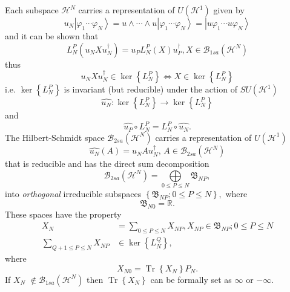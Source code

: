 \documentclass[aps,preprint]{revtex4}%
\begin{document}
Each subspace $\mathcal{H}^{N}$ carries a representation of $U\left(
\mathcal{H}^{1}\right)  $ given by
\begin{equation}
u_{N}\left\vert \varphi_{1}\cdots\varphi_{N}\right\rangle =u\wedge\cdots\wedge
u\left\vert \varphi_{1}\cdots\varphi_{N}\right\rangle =\left\vert u\varphi
_{1}\cdots u\varphi_{N}\right\rangle
\end{equation}
and it can be shown that
\begin{equation}
L_{N}^{P}\left(  u_{N}Xu_{N}^{\dagger}\right)  =u_{P}L_{N}^{P}\left(
X\right)  u_{P}^{\dagger},X\in\mathcal{B}_{1sa}\left(  \mathcal{H}^{N}\right)
\end{equation}
thus
\begin{equation}
u_{N}Xu_{N}^{\dagger}\in\ker\left\{  L_{N}^{P}\right\}  \Leftrightarrow
X\in\ker\left\{  L_{N}^{P}\right\}
\end{equation}
i.e. $\ker\left\{  L_{N}^{P}\right\}  $ is invariant (but reducible) under the
action of $SU\left(  \mathcal{H}^{1}\right)  $
\begin{equation}
\widehat{u_{N}}:\ker\left\{  L_{N}^{P}\right\}  \rightarrow\ker\left\{
L_{N}^{P}\right\}
\end{equation}
and
\begin{equation}
\widehat{u_{P}}\circ L_{N}^{P}=L_{N}^{P}\circ\widehat{u_{N}}.
\end{equation}
The Hilbert-Schmidt space $\mathcal{B}_{2sa}\left(  \mathcal{H}^{N}\right)  $
carries a representation of $U\left(  \mathcal{H}^{1}\right)  $
\begin{equation}
\widehat{u_{N}}\left(  A\right)  =u_{N}Au_{N}^{\dagger},\,A\in\mathcal{B}%
_{2sa}\left(  \mathcal{H}^{N}\right)
\end{equation}
that is reducible and has the direct sum decomposition
\begin{equation}
\mathcal{B}_{2sa}\left(  \mathcal{H}^{N}\right)  =%
{\displaystyle\bigoplus\limits_{0\leq P\leq N}}
\mathfrak{B}_{NP},
\end{equation}
into \emph{orthogonal }irreducible subspaces $\left\{  \mathfrak{B}_{NP};0\leq
P\leq N\right\}  ,$ where
\begin{equation}
\mathfrak{B}_{N0}=\mathbb{R}.
\end{equation}
These spaces have the property
\begin{align}
X_{N}  &  =\sum_{0\leq P\leq N}X_{NP},X_{NP}\in\mathfrak{B}_{NP};0\leq P\leq
N\\
\sum_{Q+1\leq P\leq N}X_{NP}  &  \in\ker\left\{  L_{N}^{Q}\right\}  ,
\end{align}
where
\begin{equation}
X_{N0}=\operatorname*{Tr}\left\{  X_{N}\right\}  P_{N}.
\end{equation}
If $X_{N}$ $\notin\mathcal{B}_{1sa}\left(  \mathcal{H}^{N}\right)  $ then
$\operatorname*{Tr}\left\{  X_{N}\right\}  $ can be formally set as $\infty$
or $-\infty.$
\end{document}
